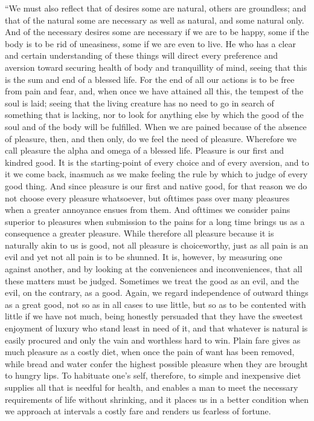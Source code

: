 ``We must also reflect that of desires some are natural, others are
groundless; and that of the natural some are necessary as well as
natural, and some natural only. And of the necessary desires some are
necessary if we are to be happy, some if the body is to be rid of
uneasiness, some if we are even to live. He who has a clear and
certain understanding of these things will direct every preference and
aversion toward securing health of body and tranquillity of mind,
seeing that this is the sum and end of a blessed life. For the end of
all our actions is to be free from pain and fear, and, when once we
 have attained all this, the tempest of the soul is laid;
seeing that the living creature has no need to go in search of
something that is lacking, nor to look for anything else by which the
good of the soul and of the body will be fulfilled. When we are pained
because of the absence of pleasure, then, and then only, do we feel
the need of pleasure. Wherefore we call pleasure the alpha and omega
of a blessed life. Pleasure is our first and kindred good. It is the
starting-point of every choice and of every aversion, and to it we
come back, inasmuch as we make feeling the rule by which to judge of
every good thing. And since pleasure is our first and native good, for
that reason we do not choose every pleasure whatsoever, but ofttimes
pass over many pleasures when a greater annoyance ensues from them.
And ofttimes we consider pains superior to pleasures when submission
to the pains for a long time brings us as a consequence a greater
pleasure. While therefore all pleasure because it is naturally akin to
us is good, not all pleasure is choiceworthy, just as all pain is an
evil and yet not all pain is to be shunned. It is, however, by
measuring one against another, and by looking at the conveniences and
inconveniences, that all these matters must be judged. Sometimes we
treat the good as an evil, and the evil, on the contrary, as a good.
Again, we regard independence of outward things as a great good, not
so as in all cases to use little, but so as to be contented with
little if we have not much, being honestly persuaded that they have
the sweetest enjoyment of luxury who stand least in need of it, and
that whatever is natural is easily procured and only the vain and
worthless hard to win. Plain fare  gives as much pleasure as
a costly diet, when once the pain of want has been removed, while
bread and water confer the highest possible pleasure when they are
brought to hungry lips. To habituate one's self, therefore, to simple
and inexpensive diet supplies all that is needful for health, and
enables a man to meet the necessary requirements of life without
shrinking, and it places us in a better condition when we approach at
intervals a costly fare and renders us fearless of fortune.

